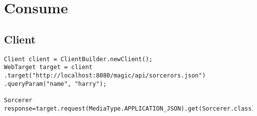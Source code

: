 \section{Consume}

\subsection{Client}

\begin{verbatim}
Client client = ClientBuilder.newClient();
WebTarget target = client
.target("http://localhost:8080/magic/api/sorcerors.json")
.queryParam("name", "harry");

Sorcerer response=target.request(MediaType.APPLICATION_JSON).get(Sorcerer.class);
\end{verbatim}






